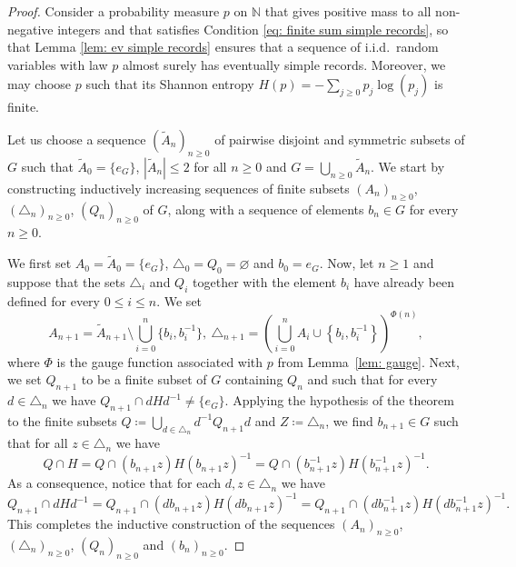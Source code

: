 \documentclass[reqno,a4paper,11pt]{amsart}
\numberwithin{equation}{section}
\newcommand{\1}{\mathbf{1}}
\def\N{{\mathbb N}}
\theoremstyle{definition}
\begin{document}
	\begin{proof}
		Consider a probability measure $p$ on $\N$ that gives positive mass to all non-negative integers and that satisfies Condition \eqref{eq: finite sum simple records}, so that Lemma \ref{lem: ev simple records} ensures that a sequence of i.i.d.\ random variables with law $p$ almost surely has eventually simple records. Moreover, we may choose $p$ such that its Shannon entropy $H(p)=-\sum_{j\ge 0}p_j\log(p_j)$ is finite.
		
		Let us choose a sequence $(\widetilde{A}_n)_{n \geq 0}$ of pairwise disjoint and symmetric subsets of $G$ such that $\widetilde{A}_0=\{e_G\}$, $|\widetilde{A}_n|\le 2$ for all $n\ge 0$ and $G=\bigcup_{n\ge 0} \widetilde{A}_n$.
		We start by constructing inductively increasing sequences of finite subsets $(A_n)_{n\ge 0}$, $(\triangle_n)_{n\ge 0}$, $(Q_n)_{n\ge 0}$ of $G$, along with a sequence of elements $b_n \in G$ for every $n \ge 0$.
		
		We first set $A_0=\widetilde{A}_0=\{e_G\}$, $\triangle_0=Q_0=\varnothing$ and $b_0=e_G$. Now, let $n\ge 1$ and suppose that the sets $\triangle_i$ and $Q_i$ together with the element $b_i$ have already been defined for every $0\le i\le n$. We set
		\begin{equation*}
			A_{n+1}= \widetilde{A}_{n+1}\setminus\bigcup_{i=0}^n \{b_i,b_i^{-1}\}, \
			\triangle_{n+1}=\left(\bigcup_{i=0}^n A_i\cup \left\{b_i,b_i^{-1}\right\}\right)^{\Phi(n)},
		\end{equation*}
		where $\Phi$ is the gauge function associated with $p$ from Lemma~\ref{lem: gauge}.
		Next, we set $Q_{n+1}$ to be a finite subset of $G$ containing $Q_n$ and such that for every $d\in \triangle_n$ we have $Q_{n+1}\cap dHd^{-1}\neq\{e_G\}$. Applying the hypothesis of the theorem to the finite subsets $Q\coloneqq\bigcup_{d\in \triangle_n} d^{-1}Q_{n+1}d$ and $Z\coloneqq\triangle_n$, we find $b_{n+1}\in G$ such that for all $z \in \triangle_n$ we have
		\[
		Q \cap H= Q \cap (b_{n+1}z)H (b_{n+1}z)^{-1}= Q\cap (b_{n+1}^{-1}z)H (b_{n+1}^{-1}z)^{-1}.
		\]
		As a consequence, notice that for each $d,z\in \triangle_n$ we have
		\begin{equation}\label{eq: Qconsequence}
			Q_{n+1}\cap dHd^{-1}=Q_{n+1}\cap (db_{n+1}z)H(db_{n+1}z)^{-1}=Q_{n+1}\cap (db^{-1}_{n+1}z)H(db^{-1}_{n+1}z)^{-1}.
		\end{equation}
		This completes the inductive construction of the sequences $(A_n)_{n\ge 0}$, $(\triangle_n)_{n\ge 0}$, $(Q_n)_{n\ge 0}$ and $(b_n)_{n\ge 0}$.
		

\end{proof}
\end{document}
